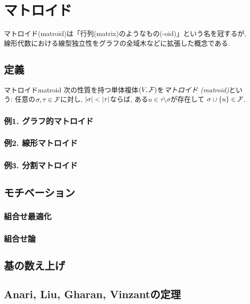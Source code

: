 \chapter{マトロイド}
マトロイド(matroid)は「行列(matrix)のようなもの(-oid)」という名を冠するが,
線形代数における線型独立性をグラフの全域木などに拡張した概念である.

\section{定義}
\begin{definition}{マトロイド}{matroid}
    次の性質を持つ単体複体$(V,\mathcal{F})$を\emph{マトロイド (matroid)}という:
    任意の$\sigma,\tau \in \mathcal{F}$に対し, $\lvert\sigma\rvert < \lvert\tau\rvert$ならば,
    ある$ u \in \tau \setminus \sigma$が存在して
    $\sigma \cup \lbrace u\rbrace \in \mathcal{F}$.
\end{definition}

\subsection{例1. グラフ的マトロイド}
\subsection{例2. 線形マトロイド}
\subsection{例3. 分割マトロイド}
\section{モチベーション}
\subsection{組合せ最適化}
\subsection{組合せ論}
\section{基の数え上げ}
\section{Anari, Liu, Gharan, Vinzantの定理}
